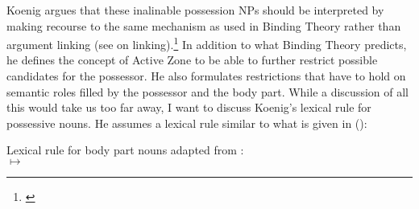 \documentclass[output=paper
 	        ,biblatex
                ,babelshorthands
                ,newtxmath
                ,draftmode
                ,colorlinks, citecolor=brown
]{langscibook}
\begin{document}
Koenig argues that these inalinable possession NPs should be interpreted by making recourse to the
same mechanism as used in Binding Theory rather than argument linking (see
 on linking).\footnote{\label{fn-non-configurational-BT-SW}%
} In addition to what Binding
Theory predicts, he defines the concept of Active Zone to be able to further restrict possible
candidates for the possessor. He also formulates restrictions that have to hold on semantic roles
filled by the possessor and the body part. While a discussion of all this would take us too far
away, I want to discuss Koenig's lexical rule for possessive nouns. He assumes a lexical rule
similar to what is given in ():

\ea
Lexical rule for body part nouns adapted from \citet[256]{Koenig1999b}:\\
 $\mapsto$\\
\flushright
{}

\medskip
\z
\end{document}
